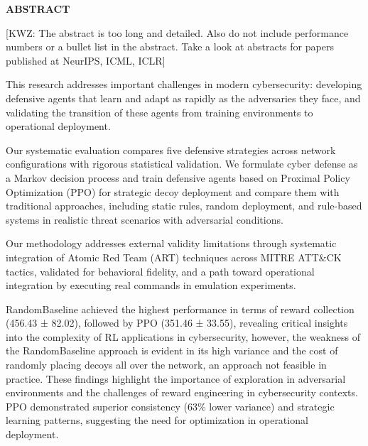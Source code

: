\documentclass[12pt,oneside]{article}
\newcommand{\kwz}[1]{
  {\color{magenta} [KWZ: {#1}]}
 }
\begin{document}



\tableofcontents
\clearpage  %

\begin{center}
\large\textbf{ABSTRACT}
\end{center}

\vspace{1em} %

\kwz{The abstract is too long and detailed. Also do not include performance numbers or a bullet list in the abstract. Take a look at abstracts for papers published at NeurIPS, ICML, ICLR}

This research addresses important challenges in modern cybersecurity: developing
defensive agents that learn and adapt as rapidly as the adversaries they face, and validating the transition of these agents from training environments to operational deployment. 

Our systematic evaluation compares five defensive strategies across network configurations with rigorous statistical validation. We formulate cyber defense as a Markov decision process and train defensive agents based on Proximal Policy Optimization (PPO) \citep{schulman2017proximal} for strategic decoy deployment and compare them with traditional approaches, including static rules, random deployment, and rule-based systems in realistic threat scenarios with adversarial conditions.

Our methodology addresses external validity limitations through systematic integration of Atomic Red Team (ART) techniques across MITRE ATT\&CK tactics, validated for behavioral fidelity, and a path toward operational integration by executing real commands in emulation experiments.

 
RandomBaseline achieved the highest performance in terms of reward collection (456.43 ± 82.02), followed by PPO (351.46 ± 33.55), revealing critical insights into the complexity of RL applications in cybersecurity, however, the weakness of the RandomBaseline approach is evident in its high variance and the cost of randomly placing decoys all over the network, an approach not feasible in practice. These findings highlight the importance of exploration in adversarial environments and the challenges of reward engineering in cybersecurity contexts. PPO demonstrated superior consistency (63\% lower variance) and strategic learning patterns, suggesting the need for optimization in operational deployment.
\end{document}
